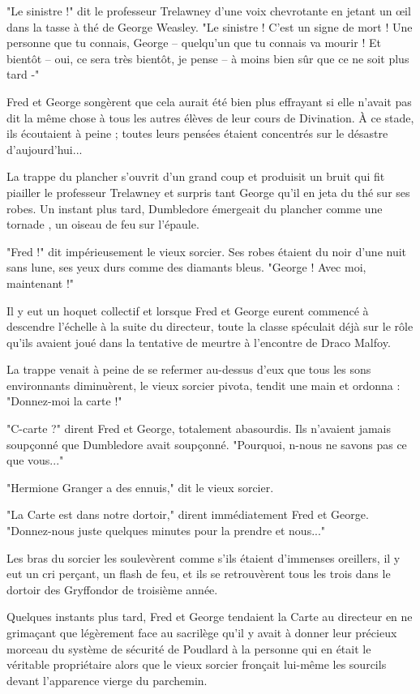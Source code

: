 "Le sinistre !" dit le professeur Trelawney d'une voix chevrotante en jetant un œil dans la tasse à thé de George Weasley. "Le sinistre ! C'est un signe de mort ! Une personne que tu connais, George – quelqu'un que tu connais va mourir ! Et bientôt – oui, ce sera très bientôt, je pense – à moins bien sûr que ce ne soit plus tard -"

Fred et George songèrent que cela aurait été bien plus effrayant si elle n'avait pas dit la même chose à tous les autres élèves de leur cours de Divination. À ce stade, ils écoutaient à peine ; toutes leurs pensées étaient concentrés sur le désastre d'aujourd'hui...

La trappe du plancher s'ouvrit d'un grand coup et produisit un bruit qui fit piailler le professeur Trelawney et surpris tant George qu'il en jeta du thé sur ses robes. Un instant plus tard, Dumbledore émergeait du plancher comme une tornade , un oiseau de feu sur l'épaule.

"Fred !" dit impérieusement le vieux sorcier. Ses robes étaient du noir d'une nuit sans lune, ses yeux durs comme des diamants bleus. "George ! Avec moi, maintenant !"

Il y eut un hoquet collectif et lorsque Fred et George eurent commencé à descendre l'échelle à la suite du directeur, toute la classe spéculait déjà sur le rôle qu'ils avaient joué dans la tentative de meurtre à l'encontre de Draco Malfoy.

La trappe venait à peine de se refermer au-dessus d'eux que tous les sons environnants diminuèrent, le vieux sorcier pivota, tendit une main et ordonna : "Donnez-moi la carte !"

"C-carte ?" dirent Fred et George, totalement abasourdis. Ils n'avaient jamais soupçonné que Dumbledore avait soupçonné. "Pourquoi, n-nous ne savons pas ce que vous..."

"Hermione Granger a des ennuis," dit le vieux sorcier.

"La Carte est dans notre dortoir," dirent immédiatement Fred et George. "Donnez-nous juste quelques minutes pour la prendre et nous..."

Les bras du sorcier les soulevèrent comme s'ils étaient d'immenses oreillers, il y eut un cri perçant, un flash de feu, et ils se retrouvèrent tous les trois dans le dortoir des Gryffondor de troisième année.

Quelques instants plus tard, Fred et George tendaient la Carte au directeur en ne grimaçant que légèrement face au sacrilège qu'il y avait à donner leur précieux morceau du système de sécurité de Poudlard à la personne qui en était le véritable propriétaire alors que le vieux sorcier fronçait lui-même les sourcils devant l'apparence vierge du parchemin.

